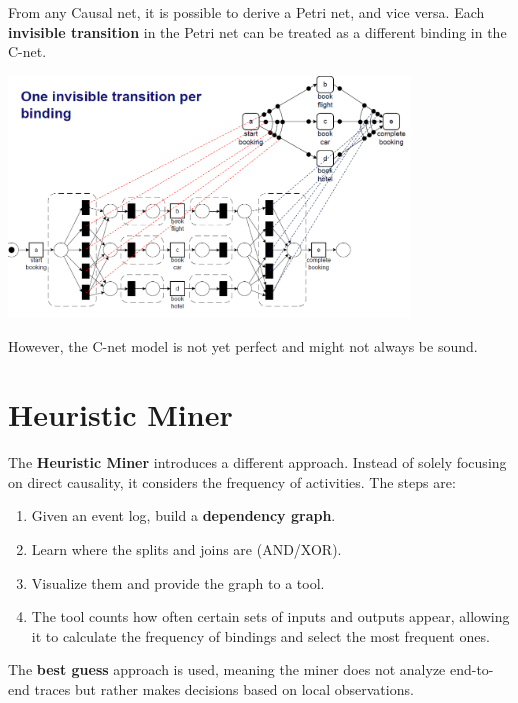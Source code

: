 From any Causal net, it is possible to derive a Petri net, and vice versa. Each \textbf{invisible transition} in the Petri net can be treated as a different binding in the C-net.

\begin{center}
    \includegraphics[width=0.8\textwidth]{capitolo 6/6 cnet to petri.png} %
\end{center}

However, the C-net model is not yet perfect and might not always be sound.

\section{Heuristic Miner}

The \textbf{Heuristic Miner} introduces a different approach. Instead of solely focusing on direct causality, it considers the frequency of activities. The steps are:
\begin{enumerate}
    \item Given an event log, build a \textbf{dependency graph}.
    \item Learn where the splits and joins are (AND/XOR).
    \item Visualize them and provide the graph to a tool.
    \item The tool counts how often certain sets of inputs and outputs appear, allowing it to calculate the frequency of bindings and select the most frequent ones.
\end{enumerate}

The \textbf{best guess} approach is used, meaning the miner does not analyze end-to-end traces but rather makes decisions based on local observations.

